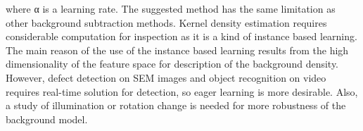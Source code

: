 \documentclass[a4paper,twocolumn, 10pt]{article}
\begin{document}
where α is a learning rate. 
The suggested method has the same limitation as other background subtraction methods. Kernel density estimation requires considerable computation for inspection as it is a kind of instance based learning. The main reason of the use of the instance based learning results from the high dimensionality of the feature space for description of the background density. However, defect detection on SEM images and object recognition on video requires real-time solution for detection, so eager learning is more desirable. Also, a study of illumination or rotation change is needed for more robustness of the background model.















%
%
\end{document}
